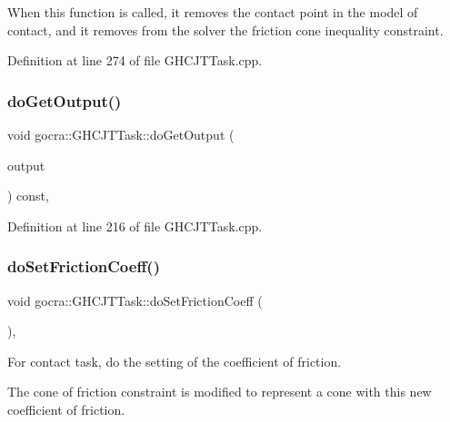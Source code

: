 When this function is called, it removes the contact point in the model of contact, and it removes from the solver the friction cone inequality constraint. 

Definition at line 274 of file G\+H\+C\+J\+T\+Task.\+cpp.

\hypertarget{classgocra_1_1GHCJTTask_a9f2cd769e33b12a5885ecd7b78a41185}{}\label{classgocra_1_1GHCJTTask_a9f2cd769e33b12a5885ecd7b78a41185} 
\subsubsection{\texorpdfstring{do\+Get\+Output()}{doGetOutput()}}
{\footnotesize\ttfamily void gocra\+::\+G\+H\+C\+J\+T\+Task\+::do\+Get\+Output (\begin{DoxyParamCaption}\item[{Eigen\+::\+Vector\+Xd \&}]{output }\end{DoxyParamCaption}) const\hspace{0.3cm}{\ttfamily [protected]}, {\ttfamily [virtual]}}



Definition at line 216 of file G\+H\+C\+J\+T\+Task.\+cpp.

\hypertarget{classgocra_1_1GHCJTTask_ab05c45917bde9d97f166356f96ee7f95}{}\label{classgocra_1_1GHCJTTask_ab05c45917bde9d97f166356f96ee7f95} 
\subsubsection{\texorpdfstring{do\+Set\+Friction\+Coeff()}{doSetFrictionCoeff()}}
{\footnotesize\ttfamily void gocra\+::\+G\+H\+C\+J\+T\+Task\+::do\+Set\+Friction\+Coeff (\begin{DoxyParamCaption}{ }\end{DoxyParamCaption})\hspace{0.3cm}{\ttfamily [protected]}, {\ttfamily [virtual]}}

For contact task, do the setting of the coefficient of friction.

The cone of friction constraint is modified to represent a cone with this new coefficient of friction. 

